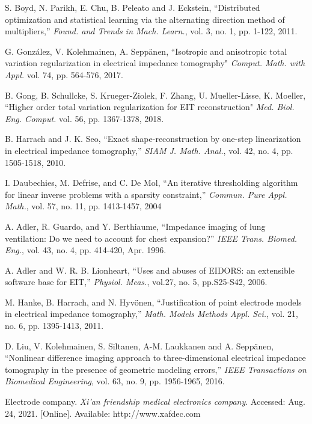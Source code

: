 \documentclass[lettersize,journal]{IEEEtran}
\begin{document}
\begin{thebibliography}{00}
 S. Boyd, N. Parikh, E. Chu, B. Peleato and J. Eckstein, ``Distributed optimization and statistical learning via the alternating direction method of multipliers,'' \emph{Found. and Trends in Mach. Learn.}, vol. 3, no. 1, pp. 1-122, 2011.

 G. Gonz\'{a}lez, V. Kolehmainen, A. Sepp\"{a}nen, ``Isotropic and anisotropic total variation regularization in electrical impedance tomography" \emph{Comput. Math. with Appl.}  vol. 74, pp. 564-576, 2017.

 B. Gong, B. Schullcke, S. Krueger-Ziolek, F. Zhang, U. Mueller-Lisse, K. Moeller, ``Higher order total variation regularization for EIT reconstruction" \emph{Med. Biol. Eng. Comput.} vol. 56, pp. 1367-1378, 2018.

 B. Harrach and J. K. Seo, ``Exact shape-reconstruction by one-step linearization in electrical impedance tomography,'' \emph{SIAM J. Math. Anal.}, vol. 42, no. 4, pp. 1505-1518, 2010.

  I. Daubechies, M. Defrise, and C. De Mol, ``An iterative thresholding algorithm for linear inverse problems with a sparsity constraint,'' \emph{Commun. Pure Appl. Math.}, vol. 57, no. 11, pp. 1413-1457, 2004

  A. Adler, R. Guardo, and Y. Berthiaume, ``Impedance imaging of lung ventilation: Do we need to account for chest expansion?'' \emph{IEEE Trans. Biomed. Eng.}, vol. 43, no. 4, pp. 414-420, Apr. 1996.

 A. Adler and W. R. B. Lionheart, ``Uses and abuses of EIDORS: an extensible software base for EIT,'' \emph{Physiol. Meas.}, vol.27, no. 5, pp.S25-S42, 2006.

 M. Hanke, B. Harrach, and N. Hyv{\"o}nen, ``Justification of point electrode models in electrical impedance tomography,'' \emph{Math. Models Methods Appl. Sci.}, vol. 21, no. 6, pp. 1395-1413, 2011.

 D. Liu, V. Kolehmainen, S. Siltanen, A-M. Laukkanen and A. Sepp{\"a}nen, ``Nonlinear difference imaging approach to three-dimensional electrical impedance tomography in the presence of geometric modeling errors,'' \emph{IEEE Transactions on Biomedical Engineering}, vol. 63, no. 9, pp. 1956-1965, 2016.


 Electrode company. \emph{Xi'an friendship medical electronics company}. Accessed: Aug. 24, 2021. [Online]. Available: http://www.xafdec.com


\end{thebibliography}
\end{document}
